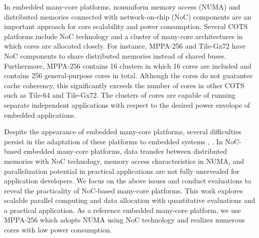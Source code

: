 In embedded many-core platforms, nonuniform memory access (NUMA) and distributed memories connected with network-on-chip (NoC) components are an important approach for core scalability and power consumption.
Several COTS platforms include NoC technology and a cluster of many-core architectures in which cores are  allocated closely.
For instance, MPPA-256 and Tile-Gx72 have NoC components to share distributed memories instead of shared buses.
Furthermore, MPPA-256 contains 16 clusters in which 16 cores are included and contains 256 general-purpose cores in total.
Although the cores do not guarantee cache coherency, this significantly exceeds the number of cores in other COTS such as Tile-64 and Tile-Gx72.  
The clusters of cores are capable of running separate independent applications with respect to the desired power envelope of embedded applications.

Despite the appearance of embedded many-core platforms, several difficulties persist in the adaptation of these platforms to embedded systems \cite{becker2016contention}, \cite{saidi2015shift}.
In NoC-based embedded many-core platforms, data transfer between distributed memories with NoC technology, memory access characteristics in NUMA, and parallelization potential in practical applications are not fully unrevealed for application developers.
We focus on the above issues and conduct evaluations to reveal the practicality of NoC-based many-core platforms.
This work explores scalable parallel computing and data allocation with quantitative evaluations and a practical application.
As a reference embedded many-core platform, we use MPPA-256 \cite{de2014time} which adopts NUMA using NoC technology and realizes numerous cores with low power consumption.  


